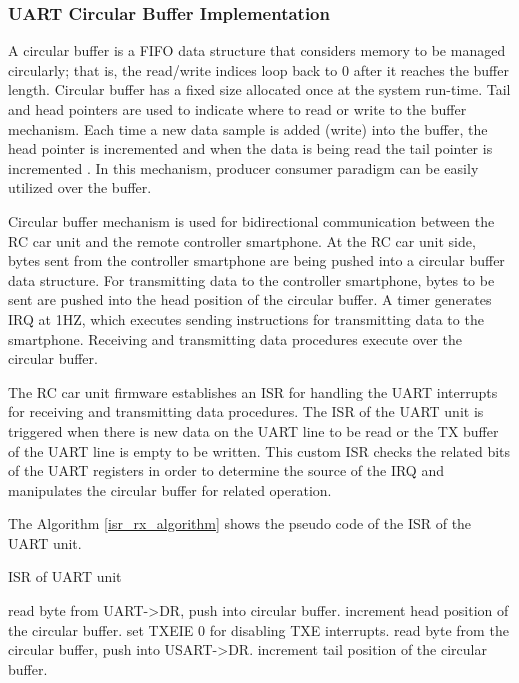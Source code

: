 \subsubsection{UART Circular Buffer Implementation}
\label{sec_uart_circular_buff}

A circular buffer is a FIFO data structure that considers memory to be managed circularly; that is, the read/write indices loop back to 0 after it reaches the buffer length. Circular buffer has a fixed size allocated once at the system run-time. Tail and head pointers are used to indicate where to read or write to the buffer mechanism. Each time a new data sample is added (write) into the buffer, the head pointer is incremented and when the data is being read the tail pointer is incremented \cite{Ref_circ-buffer} \cite{Ref_circ_buffer_paper}. In this mechanism, producer consumer paradigm can be easily utilized over the buffer.

Circular buffer mechanism is used for bidirectional communication between the RC car unit and the remote controller smartphone. At the RC car unit side, bytes sent from the controller smartphone are being pushed into a circular buffer data structure. For transmitting data to the controller smartphone, bytes to be sent are pushed into the head position of the circular buffer. A timer generates IRQ at 1HZ, which executes sending instructions for transmitting data to the smartphone. Receiving and transmitting data procedures execute over the circular buffer.

The RC car unit firmware establishes an ISR for handling the UART interrupts for receiving and transmitting data procedures. The ISR of the UART unit is triggered when there is new data on the UART line to be read or the TX buffer of the UART line is empty to be written. This custom ISR checks the related bits of the UART registers in order to determine the source of the IRQ and manipulates the circular buffer for related operation.

The Algorithm \ref{isr_rx_algorithm} shows the pseudo code of the ISR of the UART unit.

\begin{algorithm}
\caption{ISR of UART unit}
\label{isr_rx_algorithm}
    \begin{algorithmic}
        \State read byte from UART->DR, push into circular buffer.
        \State increment head position of the circular buffer.
    \EndIf
            \State set TXEIE 0 for disabling TXE interrupts.
            \State read byte from the circular buffer, push into USART->DR.
            \State increment tail position of the circular buffer.
        \EndIf
    \EndIf
    \end{algorithmic}
\end{algorithm}

